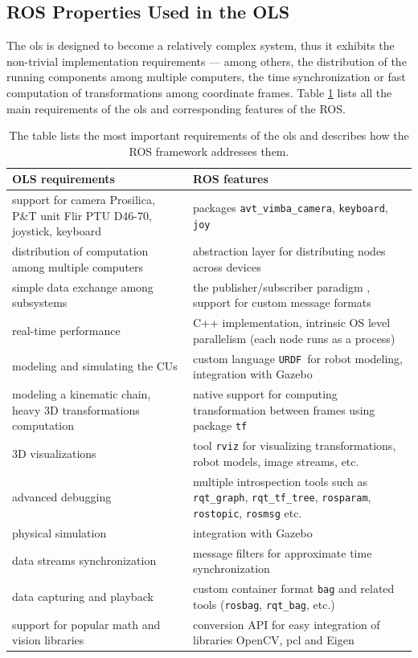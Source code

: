 \subsection{ROS Properties Used in the OLS} \label{txt:ros_properties_used_in_ols}

The \gls{ols} is designed to become a relatively complex system, thus it exhibits the non-trivial implementation requirements --- among others, the distribution of the running components among multiple computers, the time synchronization or fast computation of transformations among coordinate frames. Table \ref{tab:ols_requirements_ros_features} lists all the main requirements of the \gls{ols} and corresponding features of the ROS.

{\renewcommand{\arraystretch}{1.3}
	\begin{table}[!htbp]
		\centering
		\caption{The table lists the most important requirements of the \gls{ols} and describes how the ROS framework addresses them.}
		\begin{tabularx}{0.99\textwidth}{XX}
			\toprule
			\textbf{OLS requirements} & \textbf{ROS features} \\
			\midrule
			support for camera Prosilica, P\&T unit Flir PTU D46-70, joystick, keyboard & packages \texttt{avt\_vimba\_camera}, \texttt{keyboard}, \texttt{joy} \\
			distribution of computation among multiple computers & abstraction layer for distributing nodes across devices \\
			simple data exchange among subsystems & the publisher/subscriber paradigm \cite{O'Kane201310}, support for custom message formats \\
			real-time performance & C++ implementation, intrinsic OS level parallelism (each node runs as a process) \\
			modeling and simulating the CUs & custom language \texttt{URDF}\footnotemark ~for robot modeling, integration with Gazebo \\
			modeling a kinematic chain, heavy 3D transformations computation & native support for computing transformation between frames using package \texttt{tf} \\
			3D visualizations & tool \texttt{rviz} for visualizing transformations, robot models, image streams, etc. \\
			advanced debugging & multiple introspection tools such as \texttt{rqt\_graph}, \texttt{rqt\_tf\_tree}, \texttt{rosparam}, \texttt{rostopic}, \texttt{rosmsg} etc. \\
			physical simulation & integration with Gazebo \\
			data streams synchronization & message filters for approximate time synchronization \\
			data capturing and playback & custom container format \texttt{bag} and related tools (\texttt{rosbag}, \texttt{rqt\_bag}, etc.) \\
			support for popular math and vision libraries & conversion API for easy integration of libraries OpenCV, \gls{pcl} and Eigen \\
			\bottomrule
		\end{tabularx}
		\label{tab:ols_requirements_ros_features}
	\end{table}
}
	
